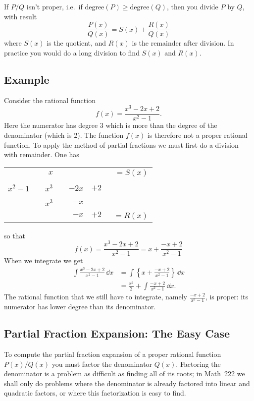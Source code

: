 If $P/Q$ isn't proper, i.e.\ if $\mathrm{degree}(P)\geq\mathrm{degree} (Q)$,
then you divide $P$ by $Q$, with result
\[
\frac{P(x)}{Q(x)} = S(x)+ \frac{R(x)}{Q(x)}
\]
where $S (x)$ is the quotient, and $R (x)$ is the remainder after division. In
practice you would do a long division to find $S(x)$ and $R(x)$.


\subsection{Example} Consider the rational function %
\[
f (x) = \frac{x^3-2x+2}{x^2-1}.
\]
Here the numerator has degree 3 which is more than the degree of the denominator
(which is 2).  The function $f(x)$ is therefore not a proper rational function.
To apply the method of partial fractions we must first do a division with
remainder. One has
\begin{center}
  \begin{tabular} {c*{6}{@{}r}} %
    & &$x$ & & && $=S(x)$ \\ 
    $x^2-1$ &\; \rule[-3pt]{1pt}{15pt}& $x^3$ &  & $-2x$ & $+2$& \\
    && \;$x^3$ &  & $-x$ & & \\ 
    &  &&     & $-x$ & $+2$ & \ $=R(x)$ \rule{0pt}{12pt}\\
  \end{tabular}
\end{center}
so that
\[
f (x) = \frac{x^3-2x+2}{x^2-1} = x + \frac{-x+2}{x^2-1}
\]
When we integrate we get
\begin{align*}
  \int \frac{x^3-2x+2}{x^2-1}\,\dd x
  &=\int\left\{x+ \frac{-x+2}{x^2-1}\right\}\,\dd x\\
  &=\frac{x^2}{2} +\int \frac{-x+2}{x^2-1}\,\dd x.
\end{align*}
The rational function that we still have to integrate, namely
$\frac{-x+2}{x^2-1}$, is proper: its numerator has lower degree than its
denominator.



\subsection{Partial Fraction Expansion: The Easy Case} %
To compute the partial fraction expansion of a proper rational function
$P(x)/Q(x)$ you must factor the denominator $Q(x)$.  Factoring the denominator
is a problem as difficult as finding all of its roots; in Math~222 we shall only
do problems where the denominator is already factored into linear and quadratic
factors, or where this factorization is easy to find.

